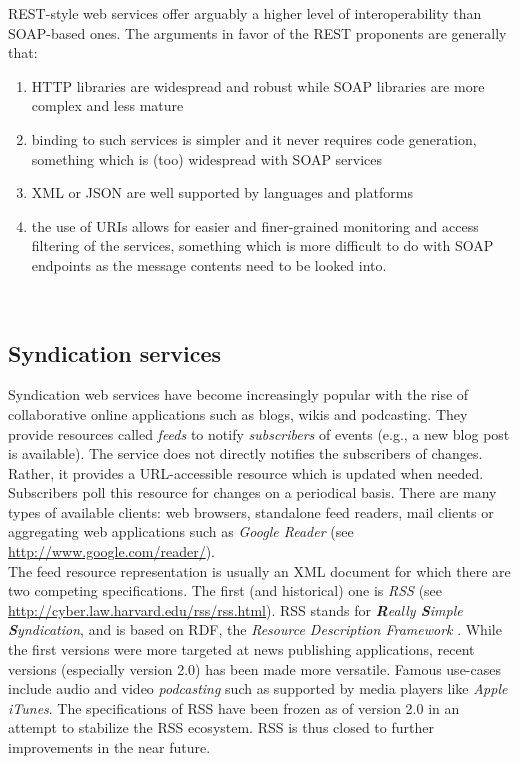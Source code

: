 REST-style web services offer arguably a higher level of interoperability than SOAP-based ones. The arguments in favor of the REST proponents are generally that:
\begin{enumerate}
  
  \item HTTP libraries are widespread and robust while SOAP libraries are more complex and less mature
  
  \item binding to such services is simpler and it never requires code generation, something which is (too) widespread with SOAP services
  
  \item XML or JSON are well supported by languages and platforms
  
  \item the use of URIs allows for easier and finer-grained monitoring and access filtering of the services, something which is more difficult to do with SOAP endpoints as the message contents need to be looked into.
  
\end{enumerate}\


\subsection{Syndication services}


Syndication web services have become increasingly popular with the rise of collaborative online applications such as blogs, wikis and podcasting. They provide resources called \emph{feeds} to notify \emph{subscribers} of events (e.g., a new blog post is available). The service does not directly notifies the subscribers of changes. Rather, it provides a URL-accessible resource which is updated when needed. Subscribers poll this resource for changes on a periodical basis.  There are many types of available clients: web browsers, standalone feed readers, mail clients or aggregating web applications such as \emph{Google Reader} (see \url{http://www.google.com/reader/}).\\

The feed resource representation is usually an XML document for which there are two competing specifications. The first (and historical) one is \emph{RSS} (see \url{http://cyber.law.harvard.edu/rss/rss.html}). RSS stands for \emph{\textbf{R}eally \textbf{S}imple \textbf{S}yndication}, and is based on RDF, the \emph{Resource Description Framework} \cite{DBRG+}. While the first versions were more targeted at news publishing applications, recent versions (especially version 2.0) has been made more versatile. Famous use-cases include audio and video \emph{podcasting} such as supported by media players like \emph{Apple iTunes}. The specifications of RSS have been frozen as of version 2.0 in an attempt to stabilize the RSS ecosystem. RSS is thus closed to further improvements in the near future.\\

